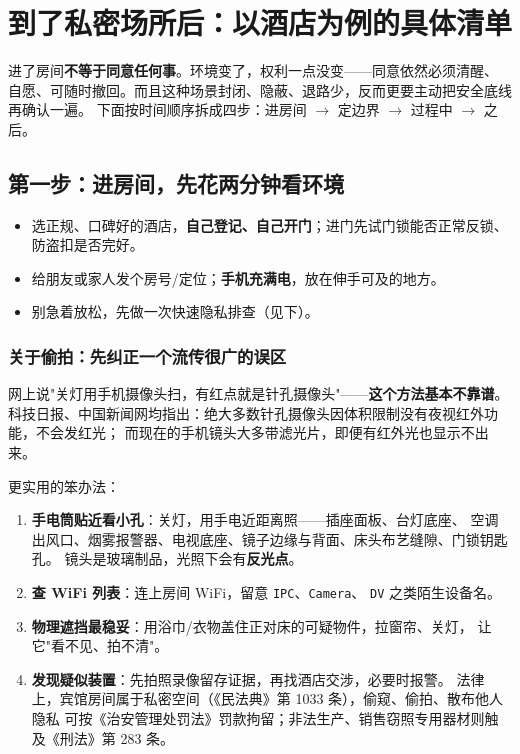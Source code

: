 \documentclass[12pt,UTF8,openany]{ctexbook}
\begin{document}
\chapter{到了私密场所后：以酒店为例的具体清单}
\label{chap:private}

进了房间\textbf{不等于同意任何事}。环境变了，权利一点没变——同意依然必须清醒、
自愿、可随时撤回。而且这种场景封闭、隐蔽、退路少，反而更要主动把安全底线再确认一遍。
下面按时间顺序拆成四步：进房间 $\to$ 定边界 $\to$ 过程中 $\to$ 之后。

\section{第一步：进房间，先花两分钟看环境}

\begin{itemize}[leftmargin=2em]
  \item 选正规、口碑好的酒店，\textbf{自己登记、自己开门}；进门先试门锁能否正常反锁、
        防盗扣是否完好。
  \item 给朋友或家人发个房号/定位；\textbf{手机充满电}，放在伸手可及的地方。
  \item 别急着放松，先做一次快速隐私排查（见下）。
\end{itemize}

\subsection*{关于偷拍：先纠正一个流传很广的误区}

网上说"关灯用手机摄像头扫，有红点就是针孔摄像头"——\textbf{这个方法基本不靠谱}。
科技日报、中国新闻网均指出：绝大多数针孔摄像头因体积限制没有夜视红外功能，不会发红光；
而现在的手机镜头大多带滤光片，即便有红外光也显示不出来。

更实用的笨办法：

\begin{enumerate}[leftmargin=2em,itemsep=0.3em]
  \item \textbf{手电筒贴近看小孔}：关灯，用手电近距离照——插座面板、台灯底座、
        空调出风口、烟雾报警器、电视底座、镜子边缘与背面、床头布艺缝隙、门锁钥匙孔。
        镜头是玻璃制品，光照下会有\textbf{反光点}。
  \item \textbf{查 WiFi 列表}：连上房间 WiFi，留意 \texttt{IPC}、\texttt{Camera}、
        \texttt{DV} 之类陌生设备名。
  \item \textbf{物理遮挡最稳妥}：用浴巾/衣物盖住正对床的可疑物件，拉窗帘、关灯，
        让它"看不见、拍不清"。
  \item \textbf{发现疑似装置}：先拍照录像留存证据，再找酒店交涉，必要时报警。
        法律上，宾馆房间属于私密空间（《民法典》第 1033 条），偷窥、偷拍、散布他人隐私
        可按《治安管理处罚法》罚款拘留；非法生产、销售窃照专用器材则触及《刑法》第 283 条。
\end{enumerate}
\end{document}
